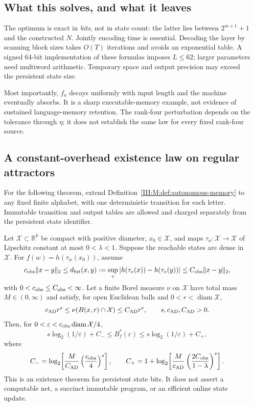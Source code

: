 \subsection{What this solves, and what it leaves}
The optimum is exact in \emph{bits}, not in state count: the latter lies
between $2^{m+1}+1$ and the constructed $N$. Jointly encoding time is
essential. Decoding the layer by scanning block sizes takes $O(T)$
iterations and avoids an exponential table. A signed 64-bit implementation of these formulas
imposes $L\le62$; larger parameters need multiword arithmetic. Temporary
space and output precision may exceed the persistent state size.

Most importantly, $f_a$
decays uniformly with input length and the machine eventually absorbs.
It is a sharp executable-memory example, not evidence of sustained
language-memory retention. The rank-four perturbation depends on the
tolerance through $\eta$; it does not establish the same law for every
fixed rank-four source.
\subsection{A constant-overhead existence law on regular attractors}
\label{III:M:sec:ahlfors-memory}
For the following theorem, extend Definition~\ref{III:M:def:autonomous-memory}
to any fixed finite alphabet, with one deterministic transition for each
letter. Immutable transition and output tables are allowed and charged
separately from the persistent state identifier.

\begin{theorem}
\label{III:M:thm:ahlfors-memory}
Let $\mathcal X\subset\mathbb R^k$ be compact with positive diameter,
$x_0\in\mathcal X$, and maps $\tau_a:\mathcal X\to\mathcal X$ of
Lipschitz constant at most $0<\lambda<1$. Suppose the reachable states
are dense in $\mathcal X$. For $f(w)=h(\tau_w(x_0))$, assume
\[
 c_{\rm obs}\|x-y\|_2\le d_{\rm fut}(x,y)
 :=\sup_v|h(\tau_v(x))-h(\tau_v(y))|
 \le C_{\rm obs}\|x-y\|_2,
\]
with $0<c_{\rm obs}\le C_{\rm obs}<\infty$.
Let a finite Borel measure $\nu$ on $\mathcal X$ have total mass
$M\in(0,\infty)$ and satisfy, for open Euclidean balls and
$0<r<\operatorname{diam}\mathcal X$,
\[
 c_{\rm AD}r^s\le\nu(B(x,r)\cap\mathcal X)
                  \le C_{\rm AD}r^s,
 \qquad s,c_{\rm AD},C_{\rm AD}>0.
\]
Then, for $0<\varepsilon<c_{\rm obs}\operatorname{diam}\mathcal X/4$,
\begin{equation}
 s\log_2(1/\varepsilon)+C_-
 \le B_f^*(\varepsilon)
 \le s\log_2(1/\varepsilon)+C_+,
 \label{III:M:eq:ahlfors-bit-law}
\end{equation}
where
\[
 C_-=\log_2\!\left[\frac{M}{C_{\rm AD}}
                         \left(\frac{c_{\rm obs}}4\right)^s\right],
 \qquad
 C_+=1+\log_2\!\left[\frac{M}{c_{\rm AD}}
                   \left(\frac{2C_{\rm obs}}{1-\lambda}\right)^s\right].
\]
This is an existence theorem for persistent state bits. It does not
assert a computable net, a succinct immutable program, or an efficient
online state update.
\end{theorem}


